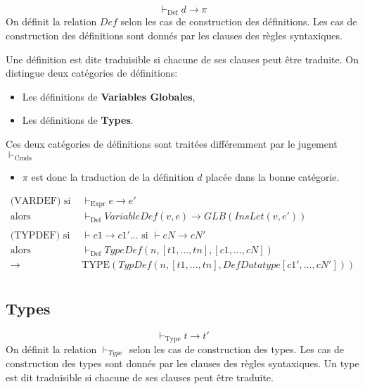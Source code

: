 \documentclass[
  12pt,
]{article}
\providecommand{\tightlist}{%
  \setlength{\itemsep}{0pt}\setlength{\parskip}{0pt}}
\begin{document}
\[ \vdash_{\text{Def}} d \rightarrow \pi \] On définit la relation
\(Def\) selon les cas de construction des définitions. Les cas de
construction des définitions sont donnés par les clauses des règles
syntaxiques.

Une définition est dite traduisible si chacune de ses clauses peut être
traduite. On distingue deux catégories de définitions:

\begin{itemize}
  \tightlist
  \item
        Les définitions de \textbf{Variables Globales},
  \item
        Les définitions de \textbf{Types}.
\end{itemize}

Ces deux catégories de définitions sont traitées différemment par le
jugement \(\vdash_{\text{Cmds}}\)

\begin{itemize}
  \tightlist
  \item
        \(\pi\) est donc la traduction de la définition \(d\) placée dans la
        bonne catégorie.
\end{itemize}

\begin{align*}
  \text{(VARDEF)}
  \text{ si }                 & \vdash_{\text{Expr}} e \rightarrow  e'                                \\
  \text{alors}                & \vdash_{\text{Def}} VariableDef(v, e) \rightarrow  GLB(InsLet(v, e')) \\
  \\
  \text{(TYPDEF)} \text{ si } & \vdash c1 \rightarrow  c1'
  \dots \text{ si } \vdash cN \rightarrow  cN'                                                        \\
  \text{alors}                & \vdash_{\text{Def}} TypeDef(n, [t1,\dots,tn], [c1,\dots,cN])          \\
  \rightarrow \;              & \text{TYPE}(TypDef(n, [t1,\dots,tn], DefDatatype[c1',\dots,cN']))     \\
\end{align*}

\hypertarget{types-2}{%
  \subsection{Types}\label{types-2}}

\[ \vdash_{\text{Type}} t \rightarrow t' \] On définit la relation
\(\vdash_{Type}\) selon les cas de construction des types. Les cas de
construction des types sont donnés par les clauses des règles
syntaxiques. Un type est dit traduisible si chacune de ses clauses peut
être traduite.
\end{document}

